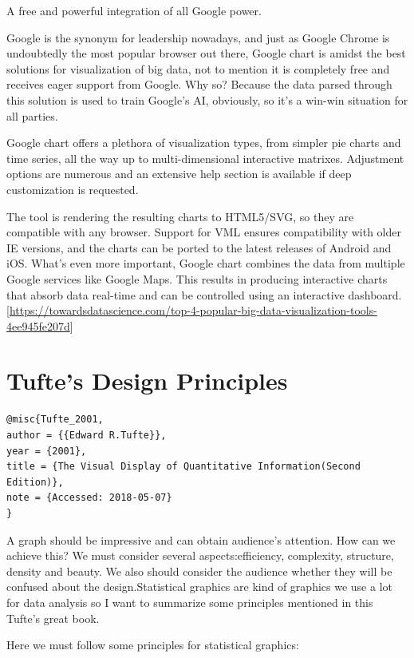 \documentclass[]{book}
\theoremstyle{definition}
\theoremstyle{definition}
\theoremstyle{definition}
\theoremstyle{remark}
\begin{document}
A free and powerful integration of all Google power.

Google is the synonym for leadership nowadays, and just as Google Chrome
is undoubtedly the most popular browser out there, Google chart is
amidst the best solutions for visualization of big data, not to mention
it is completely free and receives eager support from Google. Why so?
Because the data parsed through this solution is used to train Google's
AI, obviously, so it's a win-win situation for all parties.

Google chart offers a plethora of visualization types, from simpler pie
charts and time series, all the way up to multi-dimensional interactive
matrixes. Adjustment options are numerous and an extensive help section
is available if deep customization is requested.

The tool is rendering the resulting charts to HTML5/SVG, so they are
compatible with any browser. Support for VML ensures compatibility with
older IE versions, and the charts can be ported to the latest releases
of Android and iOS. What's even more important, Google chart combines
the data from multiple Google services like Google Maps. This results in
producing interactive charts that absorb data real-time and can be
controlled using an interactive dashboard.
{[}\url{https://towardsdatascience.com/top-4-popular-big-data-visualization-tools-4ee945fe207d}{]}

\section{Tufte's Design Principles}\label{tuftes-design-principles}

\begin{verbatim}
@misc{Tufte_2001,
author = {{Edward R.Tufte}},
year = {2001},
title = {The Visual Display of Quantitative Information(Second Edition)},
note = {Accessed: 2018-05-07}
}
\end{verbatim}

A graph should be impressive and can obtain audience's attention. How
can we achieve this? We must consider several aspects:efficiency,
complexity, structure, density and beauty. We also should consider the
audience whether they will be confused about the design.Statistical
graphics are kind of graphics we use a lot for data analysis so I want
to summarize some principles mentioned in this Tufte's great book.

Here we must follow some principles for statistical graphics:
\end{document}
